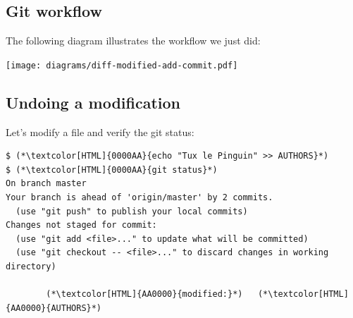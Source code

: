 \subsection{Git workflow}
\begin{frame}[fragile]
  \subslidetitle
  The following diagram illustrates the workflow we just did: \\
  \vspace{2em}
  \centerline{\texttt{[image: diagrams/diff-modified-add-commit.pdf]}}
\end{frame}

\subsection{Undoing a modification}
\begin{frame}[fragile]
\subslidetitle

  Let's modify a file and verify the git status:
  \begin{lstlisting}
$ (*\textcolor[HTML]{0000AA}{echo "Tux le Pinguin" >> AUTHORS}*)
$ (*\textcolor[HTML]{0000AA}{git status}*)
On branch master
Your branch is ahead of 'origin/master' by 2 commits.
  (use "git push" to publish your local commits)
Changes not staged for commit:
  (use "git add <file>..." to update what will be committed)
  (use "git checkout -- <file>..." to discard changes in working directory)

        (*\textcolor[HTML]{AA0000}{modified:}*)   (*\textcolor[HTML]{AA0000}{AUTHORS}*)

\end{lstlisting}

\end{frame}

